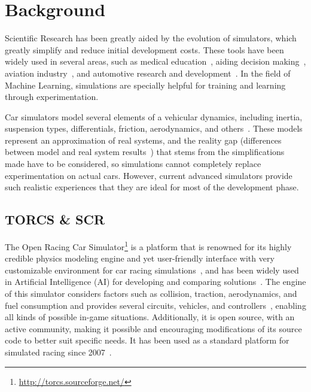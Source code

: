 \section{Background}\label{sec:2}

Scientific Research has been greatly aided by the evolution of simulators, which greatly simplify and reduce initial development costs. These tools have been widely used in several areas, such as medical education~\cite{MEDIC}, aiding decision making~\cite{useOfSimulaton2002}, aviation industry~\cite{AIR}, and automotive research and development~\cite{AUTR}. In the field of Machine Learning, simulations are specially helpful for training and learning through experimentation.

Car simulators model several elements of a vehicular dynamics, including inertia, suspension types, differentials, friction, aerodynamics, and others~\cite{SIMUTORCS}. These models represent an approximation of real systems, and the reality gap (differences between model and real system results~\cite{brookes2012authentic}) that stems from the simplifications made have to be considered, so simulations cannot completely replace experimentation on actual cars. However, current advanced simulators provide such realistic experiences that they are ideal for most of the development phase.

\subsection{TORCS \& SCR}
The Open Racing Car Simulator\footnote{\url{http://torcs.sourceforge.net/}} is a platform that is renowned for its highly credible physics modeling engine and yet user-friendly interface with very customizable environment for car racing simulations~\cite{SIMUTORCS,SCR}, and has been widely used in Artificial Intelligence (AI) for developing and comparing solutions~\cite{2009}. The engine of this simulator considers factors such as collision, traction, aerodynamics, and fuel consumption and provides several circuits, vehicles, and controllers~\cite{2009,Loiacono:2012:LEA:2212908.2212953}, enabling all kinds of possible in-game situations. Additionally, it is open source, with an active community, making it possible and encouraging modifications of its source code to better suit specific needs. It has been used as a standard platform for simulated racing since 2007~\cite{Loiacono:2012:LEA:2212908.2212953}.

